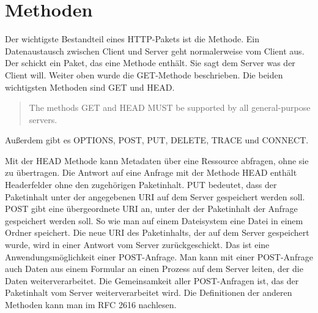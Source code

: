 \documentclass{llncs}
\begin{document}
\section{Methoden}
Der wichtigste Bestandteil eines HTTP-Pakets ist die Methode. Ein Datenaustausch zwischen Client und Server geht normalerweise vom Client aus. Der schickt ein Paket, das eine Methode enthält. Sie sagt dem Server was der Client will. Weiter oben wurde die GET-Methode beschrieben. Die beiden wichtigsten Methoden sind GET und HEAD. \begin{quote} The methods GET and HEAD MUST be supported by all general-purpose servers.\cite{Fielding1999} \end{quote}
Außerdem gibt es OPTIONS, POST, PUT, DELETE, TRACE und CONNECT. 

Mit der HEAD Methode kann Metadaten über eine Ressource abfragen, ohne sie zu übertragen. Die Antwort auf eine Anfrage mit der Methode HEAD enthält Headerfelder ohne den zugehörigen Paketinhalt.  PUT bedeutet, dass der Paketinhalt unter der angegebenen URI auf dem Server gespeichert werden soll. POST gibt eine übergeordnete URI an, unter der der Paketinhalt der Anfrage gespeichert werden soll. So wie man auf einem Dateisystem eine Datei in einem Ordner speichert. Die neue URI des Paketinhalts, der auf dem Server gespeichert wurde, wird in einer Antwort vom Server zurückgeschickt. Das ist eine Anwendungsmöglichkeit einer POST-Anfrage. Man kann mit einer POST-Anfrage auch Daten aus einem Formular an einen Prozess auf dem Server leiten, der die Daten weiterverarbeitet.
Die Gemeinsamkeit aller POST-Anfragen ist, das der Paketinhalt vom Server weiterverarbeitet wird. Die Definitionen der anderen Methoden kann man im RFC 2616 nachlesen.
\end{document}
